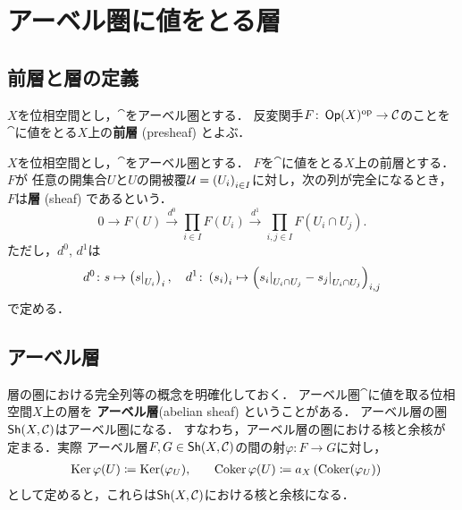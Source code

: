 \section{アーベル圏に値をとる層}

\subsection{前層と層の定義}

\begin{leftbar}
\begin{DFN}[前層]
    \(X\)を位相空間とし，\(\cat\)をアーベル圏とする．
    反変関手\(F\colon\Op(X)^{\op}\to\cat\)のことを
    \(\cat\)に値をとる\(X\)上の\textbf{前層} (presheaf) とよぶ．
\end{DFN}
\end{leftbar}

\begin{leftbar}
\begin{DFN}[層]
    \(X\)を位相空間とし，\(\cat\)をアーベル圏とする．
    \(F\)を\(\cat\)に値をとる\(X\)上の前層とする．
    \(F\)が
    任意の開集合\(U\)と\(U\)の開被覆\(
            \cU=\left(U_i\right)_{i\in I}
    \)に対し，次の列が完全になるとき，
    \(F\)は\textbf{層} (sheaf) であるという．
    \[
        0\to F(U)\overset{d^0}{\to} 
        \prod_{i\in I}F(U_i)\overset{d^1}{\to} 
        \prod_{i,j\in I}F(U_{i}\cap U_j).
    \]ただし，\(d^0\), \(d^1\)は\[
        d^0\colon s\mapsto\left(\mres[s]{U_i}\right)_i,
        \quad
        d^1\colon \left(s_i\right)_i 
        \mapsto\left(
            \mres[s_i]{U_{i}\cap U_j}-\mres[s_j]{U_{i}\cap U_j}
        \right)_{i,j}
    \]で定める．    
\end{DFN}
\end{leftbar}
















\subsection{アーベル層}
層の圏における完全列等の概念を明確化しておく．
アーベル圏$\cat$に値を取る位相空間$X$上の層を
\textbf{アーベル層}(abelian sheaf) ということがある．
アーベル層の圏$\Sh(X,\cat)$はアーベル圏になる．
すなわち，アーベル層の圏における核と余核が定まる．実際
アーベル層$F,G\in\Sh(X,\cat)$の間の射$\varphi\colon F\to G$に対し，
\begin{alignat*}{2}
    \Ker\varphi(U)&\coloneqq\Ker(\varphi_U), 
    &\quad 
    \Coker\varphi(U)&\coloneqq a_X\left(\Coker(\varphi_U)\right)
\end{alignat*}
として定めると，これらは$\Sh(X,\cat)$における核と余核になる．

